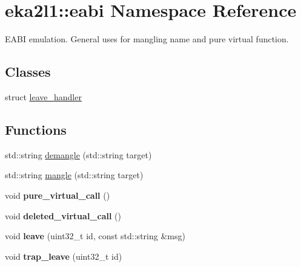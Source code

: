\hypertarget{namespaceeka2l1_1_1eabi}{}\section{eka2l1\+:\+:eabi Namespace Reference}
\label{namespaceeka2l1_1_1eabi}


E\+A\+BI emulation. General uses for mangling name and pure virtual function.  


\subsection*{Classes}
\begin{DoxyCompactItemize}
\item 
struct \mbox{\hyperlink{structeka2l1_1_1eabi_1_1leave__handler}{leave\+\_\+handler}}
\end{DoxyCompactItemize}
\subsection*{Functions}
\begin{DoxyCompactItemize}
\item 
std\+::string \mbox{\hyperlink{namespaceeka2l1_1_1eabi_a9ea6f662d297f015cb4b8df3e823f299}{demangle}} (std\+::string target)
\item 
std\+::string \mbox{\hyperlink{namespaceeka2l1_1_1eabi_a3d9fe6975adcc46f333e96086cdf86f9}{mangle}} (std\+::string target)
\item 
\mbox{\label{namespaceeka2l1_1_1eabi_aab1331c10b033962cefce18086a93bf4}} 
void {\bfseries pure\+\_\+virtual\+\_\+call} ()
\item 
\mbox{\label{namespaceeka2l1_1_1eabi_a581eb41c5242df5d35e4817784559ac9}} 
void {\bfseries deleted\+\_\+virtual\+\_\+call} ()
\item 
\mbox{\label{namespaceeka2l1_1_1eabi_a42c92994aa3e99f44e74db2603e5fcf2}} 
void {\bfseries leave} (uint32\+\_\+t id, const std\+::string \&msg)
\item 
\mbox{\label{namespaceeka2l1_1_1eabi_af9bb7a19272913d79d7211c808eb9cd0}} 
void {\bfseries trap\+\_\+leave} (uint32\+\_\+t id)
\end{DoxyCompactItemize}
